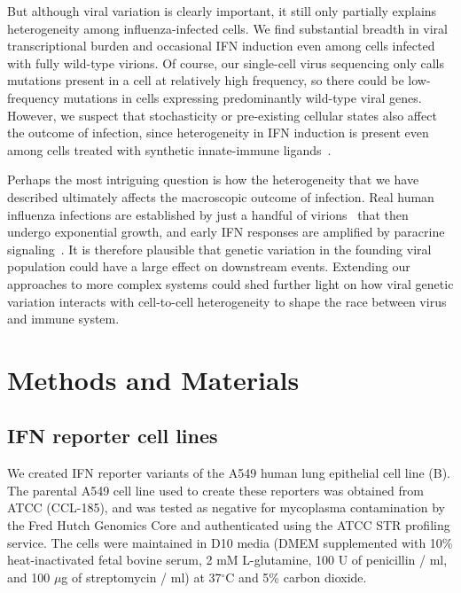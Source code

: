\documentclass[9pt,lineno]{elife}
\begin{document}
But although viral variation is clearly important, it still only partially explains heterogeneity among influenza-infected cells.
We find substantial breadth in viral transcriptional burden and occasional IFN induction even among cells infected with fully wild-type virions.
Of course, our single-cell virus sequencing only calls mutations present in a cell at relatively high frequency, so there could be low-frequency mutations in cells expressing predominantly wild-type viral genes.
However, we suspect that stochasticity or pre-existing cellular states also affect the outcome of infection, since heterogeneity in IFN induction is present even among cells treated with synthetic innate-immune ligands~\citep{shalek2013single, shalek2014single, wimmers2018single, bhushal2017cell}.

Perhaps the most intriguing question is how the heterogeneity that we have described ultimately affects the macroscopic outcome of infection.
Real human influenza infections are established by just a handful of virions~\citep{mccrone2018stochastic, xue2018reconciling, varble2014influenza} that then undergo exponential growth, and early IFN responses are amplified by paracrine signaling~\citep{stetson2006type,honda2006type}.
It is therefore plausible that genetic variation in the founding viral population could have a large effect on downstream events.
Extending our approaches to more complex systems could shed further light on how viral genetic variation interacts with cell-to-cell heterogeneity to shape the race between virus and immune system.

\clearpage


\section{Methods and Materials}

\subsection{IFN reporter cell lines}
We created IFN reporter variants of the A549 human lung epithelial cell line (B).
The parental A549 cell line used to create these reporters was obtained from ATCC (CCL-185), and was tested as negative for mycoplasma contamination by the Fred Hutch Genomics Core and authenticated using the ATCC STR profiling service.
The cells were maintained in D10 media (DMEM supplemented with 10\% heat-inactivated fetal bovine serum, 2 mM L-glutamine, 100 U of penicillin / ml, and 100 $\mu$g of streptomycin / ml) at 37$^{\circ}$C and 5\% carbon dioxide.
\end{document}
